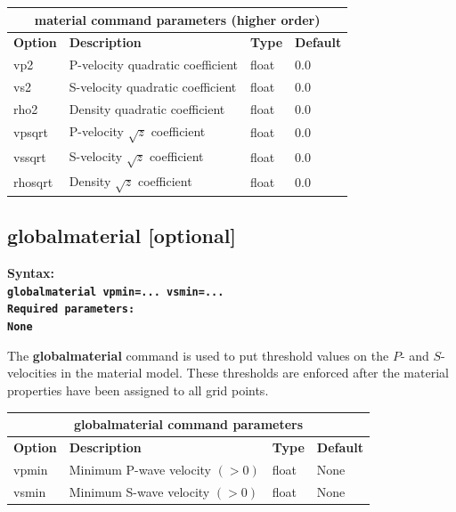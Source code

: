 \documentclass[11pt]{report}
\begin{document}
\begin{center}
\begin{tabular}{|l|p{8cm}|l|l|} \hline
\multicolumn{4}{|c|}{\bf material command parameters (higher order)}\\ \hline
\bf{Option} & \bf{Description} & \bf{Type} & \bf{Default} \\ \hline \hline
vp2 & P-velocity quadratic coefficient & float & 0.0 \\ \hline
vs2 & S-velocity quadratic coefficient & float & 0.0 \\ \hline
rho2 & Density quadratic coefficient   & float & 0.0 \\ \hline
vpsqrt & P-velocity $\sqrt{z}$ coefficient & float & 0.0 \\ \hline
vssqrt & S-velocity $\sqrt{z}$ coefficient & float & 0.0 \\ \hline
rhosqrt & Density $\sqrt{z}$ coefficient    & float & 0.0 \\ \hline
\end{tabular}
\end{center}

\subsection{globalmaterial [optional]}
\label{keyword:globalmaterial}
\begin{flushleft}\bf
Syntax:\\
\tt globalmaterial vpmin=... vsmin=...\\
\bf Required parameters:\\
\rm None
\end{flushleft}
The {\bf globalmaterial} command is used to put threshold values on the $P$- and $S$-velocities in
the material model. These thresholds are enforced after the material properties have been assigned
to all grid points.
\begin{center}
\begin{tabular}{|l|p{8cm}|l|l|} \hline
\multicolumn{4}{|c|}{\bf globalmaterial command parameters}\\ \hline
\bf{Option} & \bf{Description} & \bf{Type} & \bf{Default} \\ \hline \hline
vpmin & Minimum P-wave velocity $(>0)$ & float & None \\ \hline
vsmin & Minimum S-wave velocity $(>0)$ & float & None \\ \hline
\end{tabular}
\end{center}
\end{document}
